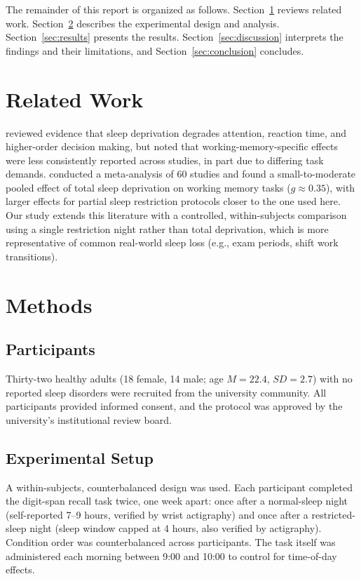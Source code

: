 \documentclass[11pt, a4paper]{article}
\begin{document}
The remainder of this report is organized as follows.
Section~\ref{sec:related-work} reviews related work.
Section~\ref{sec:methods} describes the experimental design and analysis.
Section~\ref{sec:results} presents the results.
Section~\ref{sec:discussion} interprets the findings and their
limitations, and Section~\ref{sec:conclusion} concludes.

\section{Related Work}
\label{sec:related-work}

\citet{killgore2010} reviewed evidence that sleep deprivation degrades
attention, reaction time, and higher-order decision making, but noted that
working-memory-specific effects were less consistently reported across
studies, in part due to differing task demands. \citet{lowe2017} conducted
a meta-analysis of 60 studies and found a small-to-moderate pooled effect
of total sleep deprivation on working memory tasks ($g \approx 0.35$),
with larger effects for partial sleep restriction protocols closer to the
one used here. Our study extends this literature with a controlled,
within-subjects comparison using a single restriction night rather than
total deprivation, which is more representative of common real-world sleep
loss (e.g., exam periods, shift work transitions).

\section{Methods}
\label{sec:methods}

\subsection{Participants}
Thirty-two healthy adults (18 female, 14 male; age $M = 22.4$,
$SD = 2.7$) with no reported sleep disorders were recruited from the
university community. All participants provided informed consent, and the
protocol was approved by the university's institutional review board.

\subsection{Experimental Setup}
A within-subjects, counterbalanced design was used. Each participant
completed the digit-span recall task twice, one week apart: once after a
normal-sleep night (self-reported \qty{7}{}--\qty{9}{} hours, verified by
wrist actigraphy) and once after a restricted-sleep night (sleep window
capped at \qty{4}{} hours, also verified by actigraphy). Condition order
was counterbalanced across participants. The task itself was administered
each morning between 9:00 and 10:00 to control for time-of-day effects.
\end{document}

